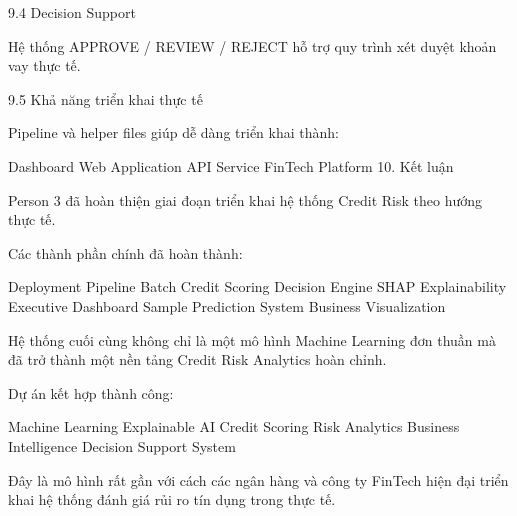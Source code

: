 9.4 Decision Support

Hệ thống APPROVE / REVIEW / REJECT hỗ trợ quy trình xét duyệt khoản vay thực tế.

9.5 Khả năng triển khai thực tế

Pipeline và helper files giúp dễ dàng triển khai thành:

Dashboard
Web Application
API Service
FinTech Platform
10. Kết luận

Person 3 đã hoàn thiện giai đoạn triển khai hệ thống Credit Risk theo hướng thực tế.

Các thành phần chính đã hoàn thành:

Deployment Pipeline
Batch Credit Scoring
Decision Engine
SHAP Explainability
Executive Dashboard
Sample Prediction System
Business Visualization

Hệ thống cuối cùng không chỉ là một mô hình Machine Learning đơn thuần mà đã trở thành một nền tảng Credit Risk Analytics hoàn chỉnh.

Dự án kết hợp thành công:

Machine Learning
Explainable AI
Credit Scoring
Risk Analytics
Business Intelligence
Decision Support System

Đây là mô hình rất gần với cách các ngân hàng và công ty FinTech hiện đại triển khai hệ thống đánh giá rủi ro tín dụng trong thực tế.
